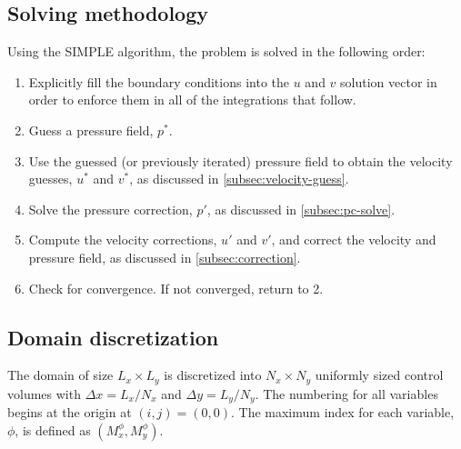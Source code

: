 \documentclass{article}
\begin{document}
\subsection{Solving methodology}

Using the SIMPLE algorithm, the problem is solved in the following order:
\begin{enumerate}
	\item Explicitly fill the boundary conditions into the $u$ and $v$ solution vector in order to enforce them in all of the integrations that follow.
	\item Guess a pressure field, $p^*$.
	\item Use the guessed (or previously iterated) pressure field to obtain the velocity guesses, $u^*$ and $v^*$, as discussed in \ref{subsec:velocity-guess}.
	\item Solve the pressure correction, $p'$, as discussed in \ref{subsec:pc-solve}.
	\item Compute the velocity corrections, $u'$ and $v'$, and correct the velocity and pressure field, as discussed in \ref{subsec:correction}.
	\item Check for convergence. If not converged, return to 2.
\end{enumerate}

\subsection{Domain discretization}

The domain of size $L_x \times L_y$ is discretized into $N_x \times N_y$ uniformly sized control volumes with $\Delta x = L_x / N_x$ and $\Delta y = L_y / N_y$. The numbering for all variables begins at the origin at $(i, j) = (0, 0)$. The maximum index for each variable, $\phi$, is defined as $(M_x^\phi, M_y^\phi)$.
\end{document}
